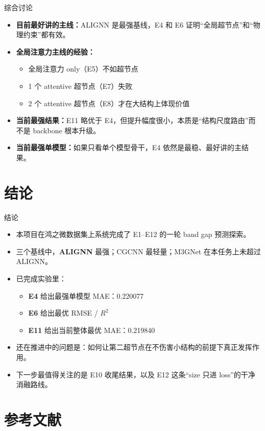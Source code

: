 \documentclass{beamer}
\begin{document}
\begin{frame}{综合讨论}
\small
\begin{itemize}
  \item \textbf{目前最好讲的主线：}ALIGNN 是最强基线，E4 和 E6 证明“全局超节点”和“物理约束”都有效。
  \item \textbf{全局注意力主线的经验：}
  \begin{itemize}
    \item 全局注意力 only（E5）不如超节点
    \item 1 个 attentive 超节点（E7）失败
    \item 2 个 attentive 超节点（E8）才在大结构上体现价值
  \end{itemize}
  \item \textbf{当前最强结果：}E11 略优于 E4，但提升幅度很小，本质是“结构尺度路由”而不是 backbone 根本升级。
  \item \textbf{当前最强单模型：}如果只看单个模型骨干，E4 依然是最稳、最好讲的主结果。
\end{itemize}
\end{frame}

\section{结论}

\begin{frame}{结论}
\small
\begin{itemize}
  \item 本项目在鸿之微数据集上系统完成了 E1--E12 的一轮 band gap 预测探索。
  \item 三个基线中，\textbf{ALIGNN} 最强；CGCNN 最轻量；M3GNet 在本任务上未超过 ALIGNN。
  \item 已完成实验里：
  \begin{itemize}
    \item \textbf{E4} 给出最强单模型 MAE：0.220077
    \item \textbf{E6} 给出最优 RMSE / $R^2$
    \item \textbf{E11} 给出当前整体最优 MAE：0.219840
  \end{itemize}
  \item 还在推进中的问题是：如何让第二超节点在不伤害小结构的前提下真正发挥作用。
  \item 下一步最值得关注的是 E10 收尾结果，以及 E12 这条“size 只进 loss”的干净消融路线。
\end{itemize}
\end{frame}

\section{参考文献}
\end{document}

